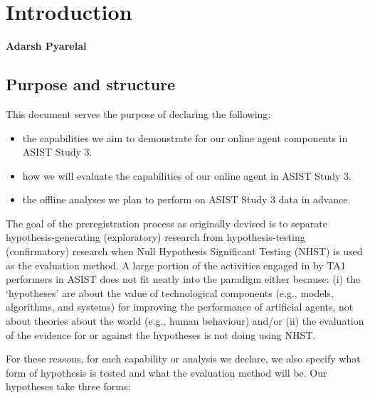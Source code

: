 \chapter{Introduction}
\textbf{Adarsh Pyarelal}

\section{Purpose and structure}

This document serves the purpose of declaring the following:

\begin{itemize}
    \item the capabilities we aim to demonstrate for our online agent
        components in ASIST Study 3.
    \item how we will evaluate the capabilities of our online agent in
        ASIST Study 3.
    \item the offline analyses we plan to perform on ASIST Study 3 data
        in advance.
\end{itemize}


The goal of the preregistration process as originally devised
\citep{Nosek.ea:2018} is to separate hypothesis-generating (exploratory)
research from hypothesis-testing (confirmatory) research when Null Hypothesis
Significant Testing (NHST) is used as the evaluation method. A large portion of
the activities engaged in by TA1 performers in ASIST does not fit neatly into
the paradigm either because: (i) the `hypotheses' are about the value of
technological components (e.g., models, algorithms, and systems) for improving
the performance of artificial agents, not about theories about the world (e.g.,
human behaviour) and/or (ii) the evaluation of the evidence for or against the
hypotheses is not doing using NHST.

For these reasons, for each capability or analysis we declare, we also specify
what form of hypothesis is tested and what the evaluation method will be. Our
hypotheses take three forms:

